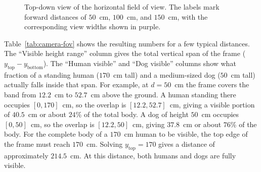 \documentclass[a4paper,12pt]{report}
\begin{document}
\begin{figure}[htbp]
\centering
{}
\caption{Top-down view of the horizontal field of view. The labels mark forward distances of
$50$~cm, $100$~cm, and $150$~cm, with the corresponding view widths shown in purple.}
\label{fig:camera-top-view}
\end{figure}

Table~\ref{tab:camera-fov} shows the resulting numbers for a few typical distances. The
``Visible height range'' column gives the total vertical span of the frame ($y_{\text{top}} -
y_{\text{bottom}}$). The ``Human visible'' and ``Dog visible'' columns show what fraction of a
standing human ($170$~cm tall) and a medium-sized dog ($50$~cm tall) actually falls inside that
span. For example, at $d = 50$~cm the frame covers the band from $12.2$~cm to $52.7$~cm above the
ground. A human standing there occupies $[0, 170]$~cm, so the overlap is $[12.2, 52.7]$~cm, giving
a visible portion of $40.5$~cm or about $24$\% of the total body. A dog of height $50$~cm occupies
$[0, 50]$~cm, so the overlap is $[12.2, 50]$~cm, giving $37.8$~cm or about $76$\% of the body.
For the complete body of a $170$~cm human to be visible, the top edge of the frame must reach
$170$~cm. Solving $y_{\text{top}} = 170$ gives a distance of approximately $214.5$~cm. At this
distance, both humans and dogs are fully visible.
\end{document}
